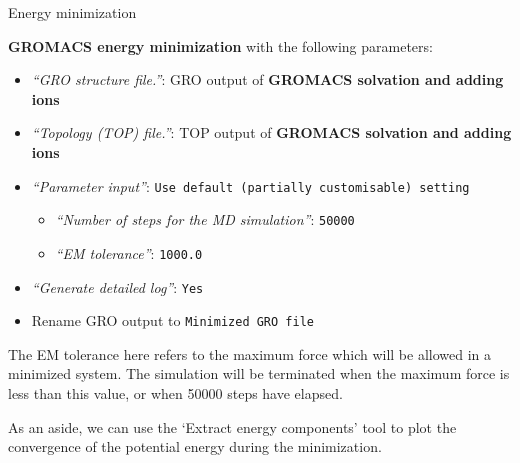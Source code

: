 \documentclass[twocolumn]{bmcart}%
\providecommand{\tightlist}{%
  \setlength{\itemsep}{0pt}\setlength{\parskip}{0pt}}
\begin{document}
\begin{handson_box_colour}{Energy minimization}


  \textbf{GROMACS energy minimization} with the following parameters:

  \begin{itemize}
  \tightlist
  \item
    \emph{``GRO structure file.''}: GRO output of
    \textbf{GROMACS solvation and adding ions}
  \item
    \emph{``Topology (TOP) file.''}: TOP output of
    \textbf{GROMACS solvation and adding ions}
  \item
    \emph{``Parameter input''}:
    \texttt{Use\ default\ (partially\ customisable)\ setting}

    \begin{itemize}
    \tightlist
    \item
      \emph{``Number of steps for the MD simulation''}: \texttt{50000}
    \item
      \emph{``EM tolerance''}: \texttt{1000.0}
    \end{itemize}
  \item
    \emph{``Generate detailed log''}: \texttt{Yes}
  \item
    Rename GRO output to \texttt{Minimized\ GRO\ file}
  \end{itemize}

\end{handson_box_colour}

The EM tolerance here refers to the maximum force which will be allowed in a minimized system. The simulation will be terminated when the maximum force is less than this value, or when 50000 steps have elapsed.

As an aside, 
we can use the `Extract energy components' tool to plot the convergence of the potential energy during the minimization.
\end{document}
